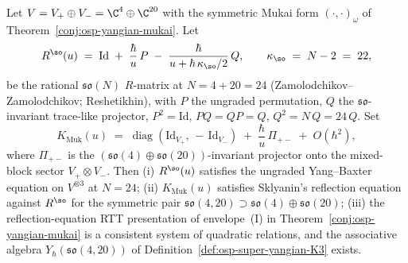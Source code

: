 \begin{proposition}
\label{prop:mukai-K-matrix-and-YBE}
Let $V = V_+ \oplus V_- = \C^4 \oplus \C^{20}$ with the symmetric
Mukai form $(\cdot,\cdot)_\omega$ of
Theorem~\ref{conj:osp-yangian-mukai}. Let
\[
 R^{\so}(u) \;=\; \mathrm{Id} \;+\; \frac{\hbar}{u}\, P
 \;-\; \frac{\hbar}{u + \hbar\, \kappa_{\so}/2}\, Q,
 \qquad
 \kappa_{\so} \;=\; N - 2 \;=\; 22,
\]
be the rational $\mathfrak{so}(N)$ $R$-matrix at $N = 4 + 20 = 24$
\textup{(}Zamolodchikov--Zamolodchikov; Reshetikhin\textup{)}, with
$P$ the ungraded permutation, $Q$ the $\mathfrak{so}$-invariant
trace-like projector, $P^2 = \mathrm{Id}$, $P Q = Q P = Q$,
$Q^2 = N\, Q = 24\, Q$. Set
\[
 K_{\mathrm{Muk}}(u) \;=\; \operatorname{diag}(\mathrm{Id}_{V_+},\, -\,\mathrm{Id}_{V_-})
 \;+\; \frac{\hbar}{u}\,\Pi_{+-}
 \;+\; O(\hbar^2),
\]
where $\Pi_{+-}$ is the $(\mathfrak{so}(4) \oplus \mathfrak{so}(20))$-invariant
projector onto the mixed-block sector $V_+ \otimes V_-$. Then
\textup{(i)} $R^{\so}(u)$ satisfies the ungraded Yang--Baxter equation
on $V^{\otimes 3}$ at $N = 24$; \textup{(ii)} $K_{\mathrm{Muk}}(u)$
satisfies Sklyanin's reflection equation against $R^{\so}$ for the
symmetric pair $\mathfrak{so}(4, 20) \supset \mathfrak{so}(4) \oplus
\mathfrak{so}(20)$; \textup{(iii)} the reflection-equation RTT
presentation of envelope~(I) in
Theorem~\ref{conj:osp-yangian-mukai} is a consistent system of
quadratic relations, and the associative algebra
$Y_\hbar(\mathfrak{so}(4, 20))$ of
Definition~\ref{def:osp-super-yangian-K3} exists.
\end{proposition}

